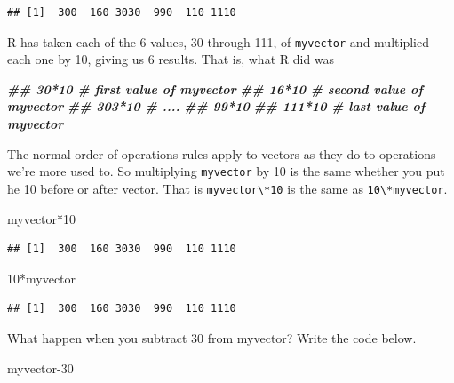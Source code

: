 \documentclass[
]{book}
\newenvironment{Shaded}{\begin{snugshade}}{\end{snugshade}}
\newcommand{\DecValTok}[1]{\textcolor[rgb]{0.00,0.00,0.81}{#1}}
\newcommand{\DocumentationTok}[1]{\textcolor[rgb]{0.56,0.35,0.01}{\textbf{\textit{#1}}}}
\newcommand{\NormalTok}[1]{#1}
\newcommand{\SpecialCharTok}[1]{\textcolor[rgb]{0.00,0.00,0.00}{#1}}
\begin{document}
\begin{verbatim}
## [1]  300  160 3030  990  110 1110
\end{verbatim}

R has taken each of the 6 values, 30 through 111, of \texttt{myvector} and multiplied each one by 10, giving us 6 results. That is, what R did was

\begin{Shaded}
\begin{Highlighting}[]
\DocumentationTok{\#\# 30*10    \# first value of myvector}
\DocumentationTok{\#\# 16*10    \# second value of myvector}
\DocumentationTok{\#\# 303*10   \# ....}
\DocumentationTok{\#\# 99*10}
\DocumentationTok{\#\# 111*10   \# last value of myvector}
\end{Highlighting}
\end{Shaded}

The normal order of operations rules apply to vectors as they do to operations we're more used to. So multiplying \texttt{myvector} by 10 is the same whether you put he 10 before or after vector. That is \texttt{myvector\textbackslash{}*10} is the same as \texttt{10\textbackslash{}*myvector}.

\begin{Shaded}
\begin{Highlighting}[]
\NormalTok{myvector}\SpecialCharTok{*}\DecValTok{10}
\end{Highlighting}
\end{Shaded}

\begin{verbatim}
## [1]  300  160 3030  990  110 1110
\end{verbatim}

\begin{Shaded}
\begin{Highlighting}[]
\DecValTok{10}\SpecialCharTok{*}\NormalTok{myvector}
\end{Highlighting}
\end{Shaded}

\begin{verbatim}
## [1]  300  160 3030  990  110 1110
\end{verbatim}

What happen when you subtract 30 from myvector? Write the code below.

\begin{Shaded}
\begin{Highlighting}[]
\NormalTok{myvector}\DecValTok{{-}30}
\end{Highlighting}
\end{Shaded}
\end{document}

